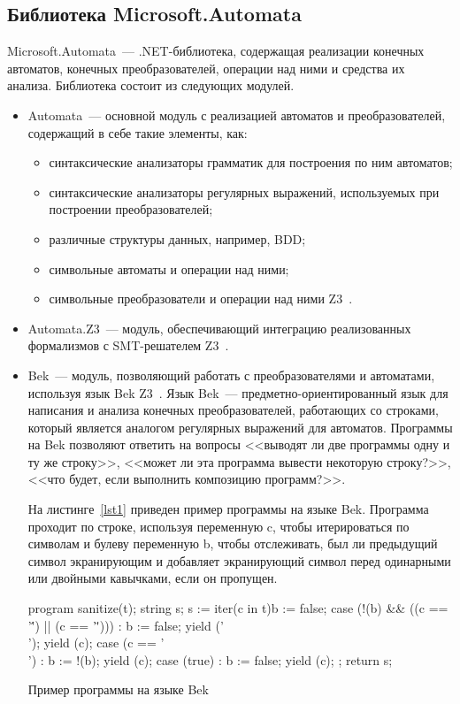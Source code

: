 \subsection{Библиотека Microsoft.Automata}
Microsoft.Automata~--- .NET-библиотека, содержащая реализации конечных автоматов, конечных преобразователей, операции над ними и средства их анализа. Библиотека состоит из следующих модулей.
\begin{itemize}
\item Automata~--- основной модуль с реализацией автоматов и преобразователей, содержащий в себе такие элементы, как:
    \begin{itemize}
    \item синтаксические анализаторы грамматик для построения по ним автоматов;
    \item синтаксические анализаторы регулярных выражений, используемых при построении преобразователей;
    \item различные структуры данных, например, BDD;
    \item символьные автоматы и операции над ними;
    \item символьные преобразователи и операции над ними Z3~\cite{STcompose}. 
    \end{itemize}
\item Automata.Z3~--- модуль, обеспечивающий интеграцию реализованных формализмов с SMT-решателем Z3~\cite{Z3Url, articleZ3}.
\item Bek~--- модуль, позволяющий работать с преобразователями и автоматами, используя язык Bek Z3~\cite{BekUrl, BekArticle}. Язык Bek~--- предметно-ориентированный язык для написания и анализа конечных преобразователей, работающих со строками, который является аналогом регулярных выражений для автоматов. Программы на Bek позволяют ответить на вопросы <<выводят ли две программы одну и ту же строку>>, <<может ли эта программа вывести некоторую строку?>>, <<что будет, если выполнить композицию программ?>>.

На листинге~\ref{lst1} приведен пример программы на языке Bek. Программа проходит по строке, используя переменную c, чтобы итерироваться по символам и булеву переменную b, чтобы отслеживать, был ли предыдущий символ экранирующим и добавляет экранирующий символ перед одинарными или двойными кавычками, если он пропущен. 

\begin{listing}[H]
    \begin{pyglist}[language=csharp,numbers=left,numbersep=5pt]
program sanitize(t);
    string s; 
    s := iter(c in t){b := false;}{
            case (!(b) && ((c == '\'') || (c == '\"'))) :
                b := false;
                yield ('\\');
                yield (c);
            case (c == '\\') :
                b := !(b);
                yield (c);
            case (true) :
                b := false;
                yield (c);
            };
    return s;
    \end{pyglist}
\caption{Пример программы на языке Bek}
\label{lst1}
\end{listing}
\end{itemize}
